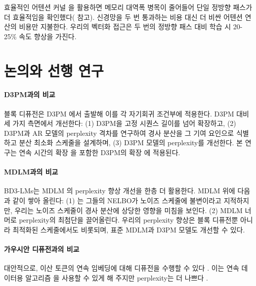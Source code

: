 \documentclass{article} %
\newcommand{\vkl}[1]{\textcolor{blue}{[VK: #1]}}
\def\algos{BD3-LMs}
\begin{document}
효율적인 어텐션 커널 \citep{dao2022flashattention, dong2024flex}을 활용하면 메모리 대역폭 병목이 줄어들어 단일 정방향 패스가 더 효율적임을 확인했다( 참고). 신경망을 두 번 통과하는 비용 대신 더 비싼 어텐션 연산의 비용만 지불한다. 우리의 벡터화 접근은 두 번의 정방향 패스 대비 학습 시 20-25\% 속도 향상을 가진다.


\section{논의와 선행 연구}


\paragraph{D3PM과의 비교}
블록 디퓨전은 D3PM \citep{austin2021structured}에서 출발해 이를 각 자기회귀 조건부에 적용한다. D3PM 대비 세 가지 측면에서 개선한다: (1) D3PM을 고정 시퀀스 길이를 넘어 확장하고, (2) D3PM과 AR 모델의 perplexity 격차를 연구하여 경사 분산을 그 기여 요인으로 식별하고 분산 최소화 스케줄을 설계하며, (3) D3PM 모델의 perplexity를 개선한다.
본 연구는 연속 시간의 확장 \citep{campbell2022continuous,sun2022score}을 포함한 D3PM의 확장 \citep{he2022diffusionbert,lou2024discrete}에 적용된다.


\paragraph{MDLM과의 비교}
\algos{}는 MDLM \citep{sahoo2024simple,shi2024simplified,ou2025your}의 perplexity 향상 개선을 한층 더 활용한다. MDLM 위에 다음과 같이 쌓아 올린다: (1) \citet{sahoo2024simple}는 그들의 NELBO가 노이즈 스케줄에 불변이라고 지적하지만, 우리는 노이즈 스케줄이 경사 분산에 상당한 영향을 미침을 보인다. (2) MDLM 너머로 perplexity의 최첨단을 끌어올린다. 우리의 perplexity 향상은 블록 디퓨전뿐 아니라 최적화된 스케줄에서도 비롯되며, 표준 MDLM과 D3PM 모델도 개선할 수 있다.

\paragraph{가우시안 디퓨전과의 비교} 대안적으로, 이산 토큰의 연속 임베딩에 대해 디퓨전을 수행할 수 있다 \citep{li2022diffusion, dieleman2022continuous, chen2022analog}. 이는 연속 데이터용 알고리즘 \citep{song2020denoising,ho2022classifier}을 사용할 수 있게 해 주지만 perplexity는 더 나쁘다 \citep{graves2023bayesian,gulrajani2024plaid}.
\end{document}
